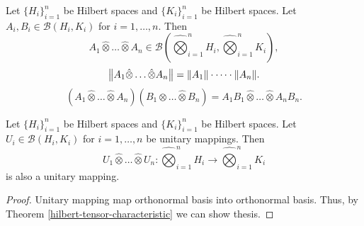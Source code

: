\documentclass[main.tex]{subfiles}
\begin{document}
\begin{theorem}
Let $\{H_i\}_{i=1}^n$ be Hilbert spaces and $\{K_i\}_{i=1}^n$ be Hilbert spaces. 
Let $A_i,B_i \in\mathcal{B}(H_i, K_i)$ for $i=1,\dots, n$. Then
\begin{equation}
A_1 \hat{\otimes} \dots \hat{\otimes} A_n \in \mathcal{B}(\hat{\bigotimes}_{i=1}^n H_i, \hat{\bigotimes}_{i=1}^n K_i),
\end{equation}
\begin{equation}
\norm{A_1 \hat{\otimes} \dots \hat{\otimes} A_n} = \norm{A_1}\cdot \dots \cdot \norm{A_n}.
\end{equation}
\begin{equation}
(A_1 \hat{\otimes} \dots \hat{\otimes} A_n)(B_1 \hat{\otimes} \dots \hat{\otimes} B_n) = A_1 B_1 \hat{\otimes} \dots \hat{\otimes} A_n B_n.
\end{equation}
\end{theorem}
\begin{theorem}
Let $\{H_i\}_{i=1}^n$ be Hilbert spaces and $\{K_i\}_{i=1}^n$ be Hilbert spaces. 
Let $U_i \in\mathcal{B}(H_i, K_i)$ for $i=1,\dots, n$ be unitary mappings. Then
\begin{equation}
U_1 \hat{\otimes} \dots \hat{\otimes} U_n: \hat{\bigotimes}_{i=1}^n H_i\to \hat{\bigotimes}_{i=1}^n K_i
\end{equation}
is also a unitary mapping.
\end{theorem}
\begin{proof}
Unitary mapping map orthonormal basis into orthonormal basis. Thus, by Theorem \ref{hilbert-tensor-characteristic} we can show thesis.
\end{proof}
\end{document}
